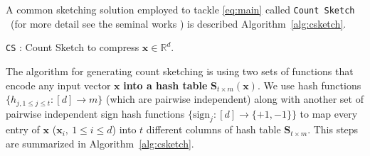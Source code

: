 A common sketching solution employed to tackle \eqref{eq:main} called \texttt{Count Sketch} ~(for more detail see the seminal works \cite{DBLP:journals/tcs/CharikarCF04, cormode2005improved,kleinberg2003bursty}) is described Algorithm~\ref{alg:csketch}.
\begin{algorithm}[b]
\caption{\texttt{CS} \cite{kleinberg2003bursty}: Count Sketch to compress ${\boldsymbol{x}}\in\mathbb{R}^{d}$. }\label{alg:csketch}
\begin{algorithmic}[1]
\end{algorithmic}
\end{algorithm}
The algorithm for generating count sketching is using two sets of functions that encode any input vector $\boldsymbol{x}$ \textbf{into a hash table} $\boldsymbol{S}_{t\times m}(\boldsymbol{x})$. We use hash functions $\{h_{j,1\leq j\leq t }:[d]\rightarrow m\}$ (which are pairwise independent) along with another set of pairwise independent sign hash functions $\{\text{sign}_{j}: [d]\rightarrow \{+1,-1\}\}$ to map every entry of $\boldsymbol{x}$ ($\boldsymbol{x}_i, \:1\leq i\leq d$) into $t$ different columns of hash table $\mathbf{S}_{t\times m}$. This steps are summarized in Algorithm~\ref{alg:csketch}.  
   
